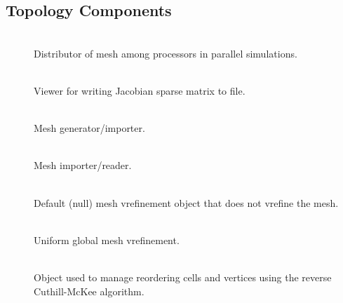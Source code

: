 \subsection{Topology Components}
\begin{description}
\item [] \\
Distributor of mesh among processors in parallel simulations.
\item [] \\
Viewer for writing Jacobian sparse matrix to file.
\item [] \\
Mesh generator/importer.
\item [] \\
Mesh importer/reader.
\item [] \\
Default (null) mesh vrefinement object that does not vrefine the mesh.
\item [] \\
Uniform global mesh vrefinement.
\item [] \\
Object used to manage reordering cells and vertices using the reverse
Cuthill-McKee algorithm.
\end{description}

